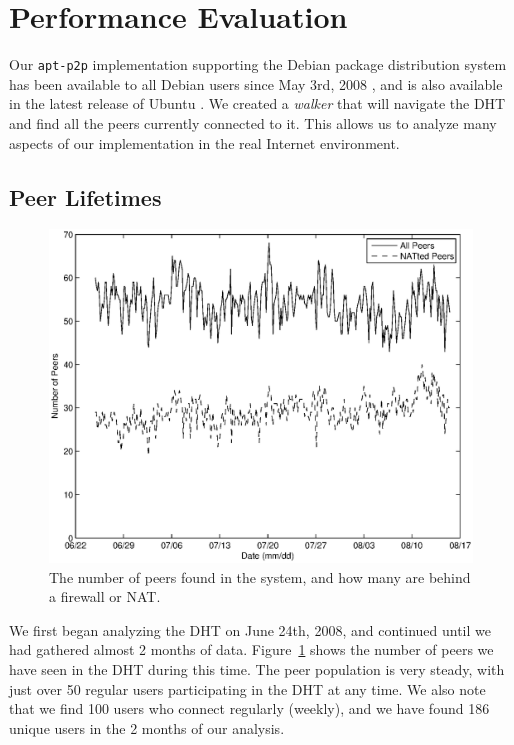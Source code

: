 \documentclass[conference]{IEEEtran}
\begin{document}

\section{Performance Evaluation}
\label{analysis}

Our \texttt{apt-p2p} implementation supporting the Debian package
distribution system has been available to all Debian users since May
3rd, 2008 \cite{apt-p2p-debian}, and is also available in the
latest release of Ubuntu \cite{apt-p2p-ubuntu}. We created
a \emph{walker} that will navigate the DHT and find all the peers
currently connected to it. This allows us to analyze many aspects of
our implementation in the real Internet environment.

\subsection{Peer Lifetimes}
\label{peer_life}

\begin{figure}
\centering
\includegraphics[width=0.80\columnwidth]{AptP2PWalker-peers.eps}
\caption{The number of peers found in the system, and how many are
behind a firewall or NAT.}
\label{walker_peers}
\end{figure}

We first began analyzing the DHT on June 24th, 2008, and continued
until we had gathered almost 2 months of data. Figure~\ref{walker_peers}
shows the number of peers we have seen in the DHT during this time.
The peer population is very steady, with just over 50 regular users
participating in the DHT at any time. We also note that we find 100
users who connect regularly (weekly), and we have found 186 unique
users in the 2 months of our analysis.
\end{document}
